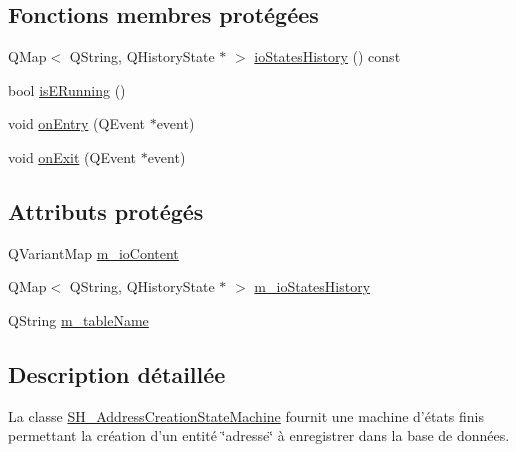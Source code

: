 \subsection*{Fonctions membres protégées}
\begin{DoxyCompactItemize}
\item 
Q\-Map$<$ Q\-String, Q\-History\-State $\ast$ $>$ \hyperlink{classSH__InOutStateMachine_a13889998c6dcd17db984dd6ed1454e80}{io\-States\-History} () const 
\item 
bool \hyperlink{classSH__InOutStateMachine_ae6c7448fbe267b035017108a9ffdff2e}{is\-E\-Running} ()
\item 
void \hyperlink{classSH__GenericStateMachine_adfd82f2532595ed7c4bcf21f03cbb951}{on\-Entry} (Q\-Event $\ast$event)
\item 
void \hyperlink{classSH__GenericStateMachine_a4b36d60fa1876908493d3d07f191a30f}{on\-Exit} (Q\-Event $\ast$event)
\end{DoxyCompactItemize}
\subsection*{Attributs protégés}
\begin{DoxyCompactItemize}
\item 
Q\-Variant\-Map \hyperlink{classSH__InOutStateMachine_a8cfbc27eef057bf37b7711bdfef2077e}{m\-\_\-io\-Content}
\item 
Q\-Map$<$ Q\-String, Q\-History\-State $\ast$ $>$ \hyperlink{classSH__InOutStateMachine_ac46ad1af230e1b2156d805275690dec3}{m\-\_\-io\-States\-History}
\item 
Q\-String \hyperlink{classSH__InOutStateMachine_aa009eecc5ab6181358faafb5996b6006}{m\-\_\-table\-Name}
\end{DoxyCompactItemize}


\subsection{Description détaillée}
La classe \hyperlink{classSH__AddressCreationStateMachine}{S\-H\-\_\-\-Address\-Creation\-State\-Machine} fournit une machine d'états finis permettant la création d'un entité \char`\"{}adresse\char`\"{} à enregistrer dans la base de données. 


\begin{DoxyItemize}
\item 
\item 
\end{DoxyItemize}

